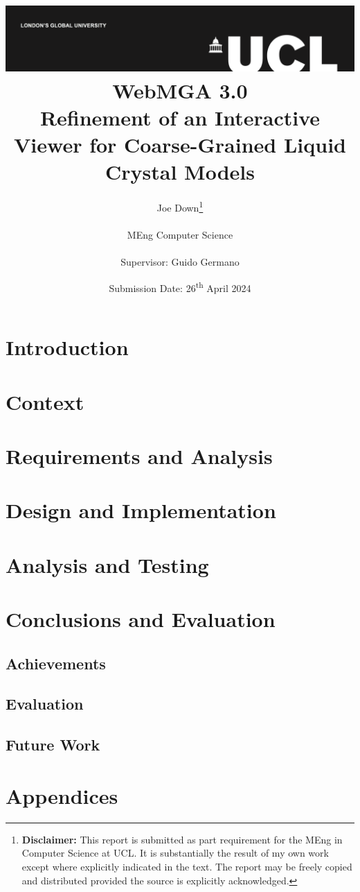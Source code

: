 \documentclass[a4paper,11pt]{report}
\title{
{\vspace{-14em} \includegraphics[width=\textwidth]{assets/images/ucl}}\\
{{\Huge WebMGA 3.0}}\\
{\large Refinement of an Interactive Viewer for Coarse-Grained Liquid Crystal Models}\\
}
\date{Submission Date: 26\textsuperscript{th} April 2024}
\author{Joe Down\thanks{
{\bf Disclaimer:}
This report is submitted as part requirement for the MEng in Computer Science at UCL. It is
substantially the result of my own work except where explicitly indicated in the text. The report may be freely copied and distributed provided the source is explicitly acknowledged.}
\\ \\
MEng Computer Science\\ \\
Supervisor: Guido Germano}
\begin{document}
 
\onehalfspacing
\maketitle

\begin{abstract}

\end{abstract}

\tableofcontents

\setcounter{page}{1}

\chapter{Introduction}


\chapter{Context}


\chapter{Requirements and Analysis}


\chapter{Design and Implementation}






\chapter{Analysis and Testing}

\chapter{Conclusions and Evaluation}
\section{Achievements}


\section{Evaluation}

\section{Future Work}

\appendix

\printbibliography

\chapter{Appendices}
%
\end{document}
